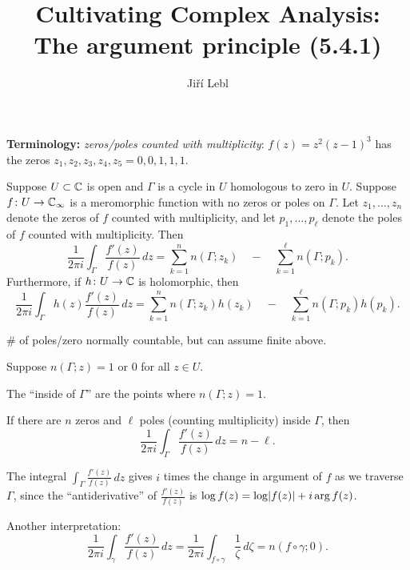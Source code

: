 \documentclass[10pt,aspectratio=169]{beamer}
\author{Ji\v{r}\'i Lebl}
\institute[OSU]{%
Departemento pri Matematiko de Oklahoma {\^S}tata Universitato}
\title{Cultivating Complex Analysis:\\%
The argument principle (5.4.1)}
\date{}
\begin{document}
\begin{frame}
\titlepage
\end{frame}

\begin{frame}
\textbf{Terminology:} \emph{zeros/poles counted with multiplicity}:
$f(z) = z^2{(z-1)}^3$ has the zeros $z_1,z_2,z_3,z_4,z_5 = 0,0,1,1,1$.

\pause

\begin{theorem}\label{thm:argprinc}
Suppose $U \subset {\mathbb{C}}$ is open and $\Gamma$ is
a cycle in $U$
homologous to zero in $U$.
Suppose $f \colon U \to {\mathbb{C}}_\infty$ is a meromorphic function with no zeros
or poles on $\Gamma$.
Let $z_1,\ldots,z_n$ denote the 
zeros of $f$ counted with multiplicity,
and let $p_1,\ldots,p_\ell$ denote the poles of $f$ counted with multiplicity.
Then
\begin{equation*}
\frac{1}{2\pi i}
\int_\Gamma \frac{f'(z)}{f(z)} \, dz
=
\sum_{k=1}^n n(\Gamma;z_k)
\quad
-
\quad
\sum_{k=1}^\ell n(\Gamma;p_k) .
\end{equation*}
\pause
Furthermore, if $h \colon U \to {\mathbb{C}}$ is holomorphic, then
\begin{equation*}
\frac{1}{2\pi i}
\int_\Gamma h(z) \frac{f'(z)}{f(z)} \, dz
=
\sum_{k=1}^n n(\Gamma;z_k)h(z_k) 
\quad
-
\quad
\sum_{k=1}^\ell n(\Gamma;p_k)h(p_k) .
\end{equation*}
\end{theorem}

\pause

\medskip

\# of poles/zero normally countable, but can assume finite above.

\end{frame}

\begin{frame}

Suppose $n(\Gamma;z) = 1$ or $0$ for all $z \in U$.

\medskip

The ``inside of
$\Gamma$'' are the points where $n(\Gamma;z)=1$.

\medskip

If there are
$n$ zeros and $\ell$ poles (counting multiplicity) inside $\Gamma$, then
\begin{equation*}
\frac{1}{2\pi i}
\int_\Gamma \frac{f'(z)}{f(z)} \, dz
= n - \ell .
\end{equation*}

\bigskip
\pause 

The integral $\int_{\Gamma} \frac{f'(z)}{f(z)} \, dz$
gives $i$ times the change in argument of $f$ as we traverse $\Gamma$,
since the ``antiderivative'' of 
$\frac{f'(z)}{f(z)}$ is $\log f(z) = \log \lvert {f(z)} \rvert + i \arg f(z)$.

\bigskip
\pause

Another interpretation:
\begin{equation*}
\frac{1}{2\pi i}
\int_{\gamma} \frac{f'(z)}{f(z)} \, dz = 
\frac{1}{2\pi i}
\int_{f \circ \gamma} \frac{1}{\zeta} \, d\zeta 
=
n(f \circ \gamma ; 0 )
.
\end{equation*}

\end{frame}
\end{document}
